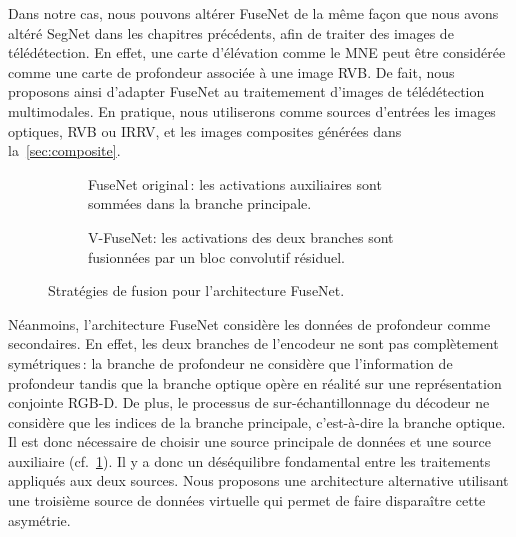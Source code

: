 Dans notre cas, nous pouvons altérer FuseNet de la même façon que nous avons altéré SegNet dans les chapitres précédents, afin de traiter des images de télédétection. En effet, une carte d'élévation comme le \gls{MNE} peut être considérée comme une carte de profondeur associée à une image \gls{RVB}. De fait, nous proposons ainsi d'adapter FuseNet au traitemement d'images de télédétection multimodales. En pratique, nous utiliserons comme sources d'entrées les images optiques, \gls{RVB} ou \gls{IRRV}, et les images composites générées dans la~\cref{sec:composite}.

\begin{figure}[h]
	\begin{subfigure}{0.48\textwidth}
    	 \resizebox{\textwidth}{!}{}
        \caption{FuseNet original\,: les activations auxiliaires sont sommées dans la branche principale.}
        \label{fig:fusenet_sum}
    \end{subfigure}
    \hfill
    \begin{subfigure}{0.48\textwidth}
    	\resizebox{\textwidth}{!}{}
        \caption{V-FuseNet: les activations des deux branches sont fusionnées par un bloc convolutif résiduel.}
        \label{fig:fusenet_mix}
    \end{subfigure}
    \caption{Stratégies de fusion pour l'architecture FuseNet.}
\end{figure}

Néanmoins, l'architecture FuseNet considère les données de profondeur comme secondaires. En effet, les deux branches de l'encodeur ne sont pas complètement symétriques\,: la branche de profondeur ne considère que l'information de profondeur tandis que la branche optique opère en réalité sur une représentation conjointe \gls{RGB-D}. De plus, le processus de sur-échantillonnage du décodeur ne considère que les indices de la branche principale, c'est-à-dire la branche optique. Il est donc nécessaire de choisir une source principale de données et une source auxiliaire (cf.~\cref{fig:fusenet_sum}). Il y a donc un déséquilibre fondamental entre les traitements appliqués aux deux sources. Nous proposons une architecture alternative utilisant une troisième source de données virtuelle qui permet de faire disparaître cette asymétrie.

